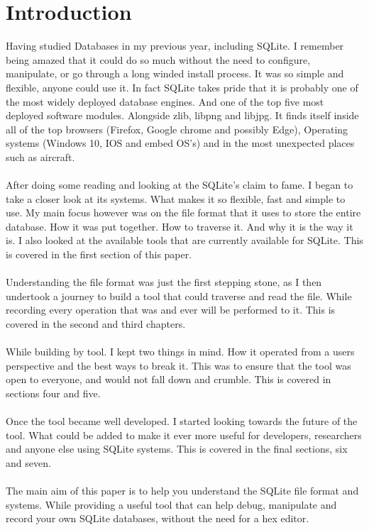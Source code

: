 \section*{Introduction}
\label{sec:introduction}

Having studied Databases in my previous year, including SQLite. I remember being amazed that it could do so much without the need to configure, manipulate, or go through a long winded install process. It was so simple and flexible, anyone could use it. In fact SQLite takes pride that it is probably one of the most widely deployed database engines. And one of the top five most deployed software modules. Alongside zlib, libpng and libjpg. It finds itself inside all of the top browsers (Firefox, Google chrome and possibly Edge), Operating systems (Windows 10, IOS and embed OS's) and in the most unexpected places such as aircraft.
\\\\
After doing some reading and looking at the SQLite's claim to fame. I began to take a closer look at its systems. What makes it so flexible, fast and simple to use. My main focus however was on the file format that it uses to store the entire database. How it was put together. How to traverse it. And why it is the way it is. I also looked at the available tools that are currently available for SQLite. This is covered in the first section of this paper.
\\\\
Understanding the file format was just the first stepping stone, as I then undertook a journey to build a tool that could traverse and read the file. While recording every operation that was and ever will be performed to it. This is covered in the second and third chapters.
\\\\
While building by tool. I kept two things in mind. How it operated from a users perspective and the best ways to break it. This was to ensure that the tool was open to everyone, and would not fall down and crumble. This is covered in sections four and five. 
\\\\
Once the tool became well developed. I started looking towards the future of the tool. What could be added to make it ever more useful for developers, researchers and anyone else using SQLite systems. This is covered in the final sections, six and seven.
\\\\
The main aim of this paper is to help you understand the SQLite file format and systems. While providing a useful tool that can help debug, manipulate and record your own SQLite databases, without the need for a hex editor.
